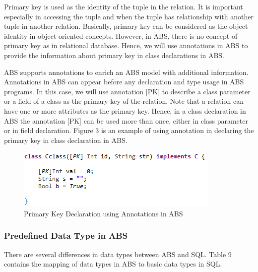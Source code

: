 \documentclass[runningheads,a4paper]{llncs}
\begin{document}
Primary key is used as the identity of the tuple in the relation. It is important especially in accessing the tuple and when the tuple has relationship with another tuple in another relation. Basically, primary key can be considered as the object identity in object-oriented concepts. However, in ABS, there is no concept of primary key as in relational database. Hence, we will use annotations in ABS to provide the information about primary key in class declarations in ABS.

ABS supports annotations to enrich an ABS model with additional information. Annotations in ABS can appear before any declaration and type usage in ABS programs. In this case, we will use annotation [PK] to describe a class parameter or a field of a class as the primary key of the relation. Note that a relation can have one or more attributes as the primary key. Hence, in a class declaration in ABS the annotation [PK] can be used more than once, either in class parameter or in field declaration. Figure 3 is an example of using annotation in declaring the primary key in class declaration in ABS.

\begin{figure}
	\centering
	\includegraphics[scale=0.7]{41.png}
	\caption{Primary Key Declaration using Annotations in ABS}
	\label{primary key}
\end{figure}

\subsubsection{Predefined Data Type in ABS}
There are several differences in data types between ABS and SQL. Table 9 contains the mapping of data types in ABS to basic data types in SQL.
\end{document}
